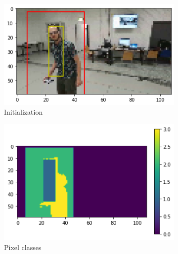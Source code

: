 \begin{figure}[!h]
	\begin{center}
		\begin{subfigure}[h]{0.24\textwidth}
			\centering
			\includegraphics[width=1\textwidth]{"contents/images/04-2grabcut-3hybrid-steps-1"}
			\caption[]{Initialization}
			\label{fig:grabcut-hybrid-explain-1}
		\end{subfigure}
		\hfill
		\begin{subfigure}[h]{0.24\textwidth}
			\centering
			\includegraphics[width=1\textwidth]{"contents/images/04-2grabcut-3hybrid-steps-2"}
			\caption[]{Pixel classes}
			\label{fig:grabcut-hybrid-explain-2}
		\end{subfigure}
		\hfill
		\begin{subfigure}[h]{0.24\textwidth}
			\centering

\end{subfigure}
\end{center}
\end{figure}
